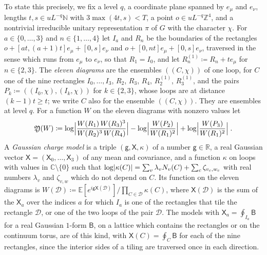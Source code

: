 \documentclass[11pt]{preprint}
\DeclarePairedDelimiter{\abs}{\lvert}{\rvert}
\numberwithin{equation}{section}
\theoremstyle{definition}
\theoremstyle{remark}
\theoremstyle{plain}
\begin{document}
To state this precisely, we fix a level $q$, a coordinate plane spanned by $e_\mu$ and $e_\nu$, lengths $t, s \in uL^{-q}\mathbb N$ with $3\max(4t, s) < T$, a point $o \in uL^{-q}\mathbb Z^4$, and a nontrivial irreducible unitary representation $\pi$ of $G$ with the character $\chi$. For $a \in \{ 0, \dots, 3 \}$ and $n \in \{ 1, \dots, 4 \}$ let $I_a$ and $R_n$ be the boundaries of the rectangles $o + [at, (a + 1)t]e_\mu + [0, s]e_\nu$ and $o + [0, nt]e_\mu + [0, s]e_\nu$, traversed in the sense which runs from $e_\mu$ to $e_\nu$, so that $R_1 = I_0$, and let $R^{(1)}_n \coloneqq R_n + te_\mu$ for $n \in \{ 2, 3 \}$. The \emph{eleven diagrams} are the ensembles $((C, \chi))$ of one loop, for $C$ one of the nine rectangles $I_0, \dots, I_3$, $R_2$, $R_3$, $R_4$, $R^{(1)}_2$, $R^{(1)}_3$, and the pairs $P_k \coloneqq ((I_0, \chi), (I_k, \chi))$ for $k \in \{ 2, 3 \}$, whose loops are at distance $(k - 1)t \geq t$; we write $C$ also for the ensemble $((C, \chi))$. They are ensembles at level $q$. For a function $W$ on the eleven diagrams with nonzero values let
\begin{equation}\label{eq:witness}
    \mathfrak Y(W) \coloneqq \log\Bigl\lvert\frac{W(R_1)\,W(R_3)^3}{W(R_2)^3\,W(R_4)}\Bigr\rvert - \log\Bigl\lvert\frac{W(P_2)}{W(R_1)^2}\Bigr\rvert + \log\Bigl\lvert\frac{W(P_3)}{W(R_1)^2}\Bigr\rvert\;.
\end{equation}
A \emph{Gaussian charge model} is a triple $(\mathsf g, \mathsf X, \kappa)$ of a number $\mathsf g \in \mathbb R$, a real Gaussian vector $\mathsf X = (\mathsf X_0, \dots, \mathsf X_3)$ of any mean and covariance, and a function $\kappa$ on loops with values in $\mathbb C \setminus \{ 0 \}$ such that $\log\abs{\kappa(C)} = \sum_v\lambda_vN_v(C) + \sum_c\zeta_{v_c,w_c}$ with real numbers $\lambda_v$ and $\zeta_{v,w}$ which do not depend on $C$. Its function on the eleven diagrams is $W(\mathcal D) \coloneqq \mathbb E[e^{i\mathsf g\mathsf X(\mathcal D)}]/\prod_{C \in \mathcal D}\kappa(C)$, where $\mathsf X(\mathcal D)$ is the sum of the $\mathsf X_a$ over the indices $a$ for which $I_a$ is one of the rectangles that tile the rectangle $\mathcal D$, or one of the two loops of the pair $\mathcal D$. The models with $\mathsf X_a = \oint_{I_a}\mathsf B$ for a real Gaussian $1$-form $\mathsf B$, on a lattice which contains the rectangles or on the continuum torus, are of this kind, with $\mathsf X(C) = \oint_C\mathsf B$ for each of the nine rectangles, since the interior sides of a tiling are traversed once in each direction.
\end{document}
